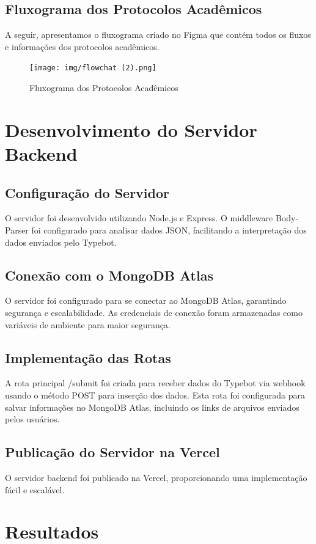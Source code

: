 \documentclass[12pt,a4paper]{article} %
\begin{document}
\subsection{Fluxograma dos Protocolos Acadêmicos}
A seguir, apresentamos o fluxograma criado no Figma que contém todos os fluxos e informações dos protocolos acadêmicos.

\begin{figure}[h!]
    \centering
    \texttt{[image: img/flowchat (2).png]}
    \caption{Fluxograma dos Protocolos Acadêmicos}
    \label{fig:fluxograma}
\end{figure}

\section{Desenvolvimento do Servidor Backend}

\subsection{Configuração do Servidor}
O servidor foi desenvolvido utilizando Node.js e Express. O middleware Body-Parser foi configurado para analisar dados JSON, facilitando a interpretação dos dados enviados pelo Typebot.

\subsection{Conexão com o MongoDB Atlas}
O servidor foi configurado para se conectar ao MongoDB Atlas, garantindo segurança e escalabilidade. As credenciais de conexão foram armazenadas como variáveis de ambiente para maior segurança.

\subsection{Implementação das Rotas}
A rota principal /submit foi criada para receber dados do Typebot via webhook usando o método POST para inserção dos dados. Esta rota foi configurada para salvar informações no MongoDB Atlas, incluindo os links de arquivos enviados pelos usuários.

\subsection{Publicação do Servidor na Vercel}
O servidor backend foi publicado na Vercel, proporcionando uma implementação fácil e escalável.

\section{Resultados}
\end{document}
